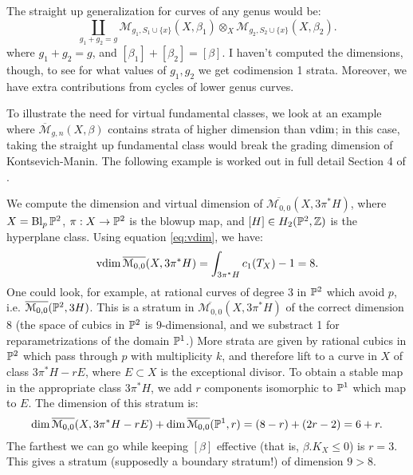 \begin{rem}
The straight up generalization for curves of any genus would be:
\[\coprod_{g_1 + g_2 = g} \mathcal{M}_{g_1,S_1\cup\{x\}}(X,\beta_1) \otimes_{X}  \mathcal{M}_{g_2,S_2\cup\{x\}}(X,\beta_2).	\]
where $g_1 + g_2 = g$, and $[\beta_1] + [\beta_2] = [\beta]$. I haven't computed the dimensions, though, to see for what values
of $g_1, g_2$ we get codimension 1 strata. Moreover, we have extra contributions from cycles of lower genus curves.
\end{rem}

To illustrate the need for virtual fundamental classes, we look at an example where $\overline{\mathcal{M}}_{g,n}(X,\beta)$
contains strata of higher dimension than $\operatorname{vdim}$; in this case, taking the straight up fundamental class would break
the grading dimension of Kontsevich-Manin.
The following example is worked out in full detail Section 4 of \cite{nabijou}.

\begin{eg}
We compute the dimension and virtual dimension of $\overline{ \mathcal{M}_{0,0}}(X, 3\pi^*H)$,
where $X = \operatorname{Bl}_p \mathbb P^2$, $\pi: X \to \mathbb P^2$ is the blowup map, and $[H] \in H_2(\mathbb P^2,\mathbb Z)$ is the hyperplane class.
Using equation \ref{eq:vdim}, we have:
\[	\operatorname{vdim} \overline{ \mathcal{M}_{0,0}}(X, 3\pi^*H) = \int_{3\pi^*H} c_1(T_X) - 1 = 8.	\]
One could look, for example, at rational curves of degree 3 in $\mathbb P^2$ which avoid $p$, i.e.
$\overline{ \mathcal{M}_{0,0}}(\mathbb P^2, 3H)$. This is a stratum in $\overline{ \mathcal{M}_{0,0}}(X, 3\pi^*H)$ of the correct dimension 8
(the space of cubics in $\mathbb P^2$ is 9-dimensional, and we substract 1 for reparametrizations of the domain $\mathbb P^1$.)
More strata are given by rational cubics in $\mathbb P^2$ which pass through $p$ with multiplicity $k$, and therefore 
lift to a curve in $X$ of class $3\pi^*H - rE$, where $E \subset X$ is the exceptional divisor. To obtain
a stable map in the appropriate class $3\pi^*H$, we add $r$ components isomorphic to $\mathbb P^1$ which map to $E$.
The dimension of this stratum is:
\[	\dim \overline{ \mathcal{M}_{0,0}}(X,3\pi^*H - rE) + \dim \overline{ \mathcal{M}_{0,0}}(\mathbb P^1,r) = (8-r) + (2r-2) = 6+r.	\]
The farthest we can go while keeping $[\beta]$ effective (that is, $\beta . K_X \leq 0$) is $r=3$. This gives a stratum
(supposedly a boundary stratum!) of dimension $9>8$.
\end{eg}

